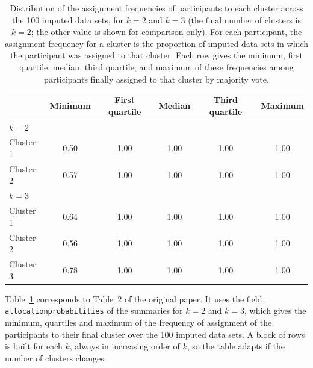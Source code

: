 \documentclass[a4paper,10pt]{article}\usepackage[]{graphicx}\usepackage[]{xcolor}
\begin{document}
\begin{table}[ht]
\centering
\begingroup\footnotesize
\begin{tabular}{lccccc}
  \toprule
 & \multicolumn{1}{c}{\bf Minimum} & \multicolumn{1}{c}{\bf First quartile} & \multicolumn{1}{c}{\bf Median} & \multicolumn{1}{c}{\bf Third quartile} & \multicolumn{1}{c}{\bf Maximum} \\ 
  \midrule
$k=2$ &  &  &  &  &  \\ 
  Cluster 1 & 0.50 & 1.00 & 1.00 & 1.00 & 1.00 \\ 
  Cluster 2 & 0.57 & 1.00 & 1.00 & 1.00 & 1.00 \\ 
  $k=3$ &  &  &  &  &  \\ 
  Cluster 1 & 0.64 & 1.00 & 1.00 & 1.00 & 1.00 \\ 
  Cluster 2 & 0.56 & 1.00 & 1.00 & 1.00 & 1.00 \\ 
  Cluster 3 & 0.78 & 1.00 & 1.00 & 1.00 & 1.00 \\ 
   \bottomrule
\end{tabular}
\endgroup
\caption{Distribution of the assignment frequencies of participants to each cluster across the 100 imputed data sets, for $k=2$ and $k=3$ (the final number of clusters is $k=2$; the other value is shown for comparison only). For each participant, the assignment frequency for a cluster is the proportion of imputed data sets in which the participant was assigned to that cluster. Each row gives the minimum, first quartile, median, third quartile, and maximum of these frequencies among participants finally assigned to that cluster by majority vote.} 
\label{tab:alloc}
\end{table}


Table~\ref{tab:alloc} corresponds to Table~2 of the original paper. It uses the field \texttt{allocationprobabilities} of the summaries for $k=2$ and $k=3$, which gives the minimum, quartiles and maximum of the frequency of assignment of the participants to their final cluster over the 100 imputed data sets. A block of rows is built for each $k$, always in increasing order of $k$, so the table adapts if the number of clusters changes.
\end{document}

